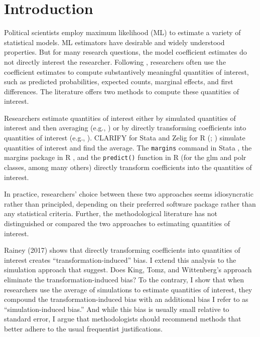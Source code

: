 \documentclass[12pt]{article}
\begin{document}
\thispagestyle{empty}
\newpage

\doublespace
\section*{Introduction}

\setcounter{page}{1}

Political scientists employ maximum likelihood (ML) to estimate a variety of statistical models. 
ML estimators have desirable and widely understood properties. 
But for many research questions, the model coefficient estimates do not directly interest the researcher. 
Following \cite{KingTomzWittenberg2000}, researchers often use the coefficient estimates to compute substantively meaningful quantities of interest, such as predicted probabilities, expected counts, marginal effects, and first differences. The literature offers two methods to compute these quantities of interest. 

Researchers estimate quantities of interest either by simulated quantities of interest and then averaging (e.g., \citealt{KingTomzWittenberg2000}) or by directly transforming coefficients into quantities of interest (e.g., \citealt{Herron1999}).
CLARIFY for Stata \citep{TomzWittenbergKing2003} and Zelig for R (\citealt{ImaiKingLau2008}; \citealt{Choiratetal}) simulate quantities of interest and find the average. 
The \texttt{margins} command in Stata \citep{StataManual}, the margins package in R \citep{margins}, and the \texttt{predict()} function in R (for the glm \citep{R} and polr \citep{MASS} classes, among many others) directly transform coefficients into the quantities of interest.

In practice, researchers' choice between these two approaches seems idiosyncratic rather than principled, depending on their preferred software package rather than any statistical criteria. 
Further, the methodological literature has not distinguished or compared the two approaches to estimating quantities of interest.

Rainey (2017) shows that directly transforming coefficients into quantities of interest creates ``transformation-induced'' bias. I extend this analysis to the simulation approach that \cite{KingTomzWittenberg2000} suggest. 
Does King, Tomz, and Wittenberg's approach eliminate the transformation-induced bias? 
To the contrary, I show that when researchers use the average of simulations to estimate quantities of interest, they compound the transformation-induced bias with an additional bias I refer to as ``simulation-induced bias.'' And while this bias is usually small relative to standard error, I argue that methodologists should recommend methods that better adhere to the usual frequentist justifications. 
\end{document}
